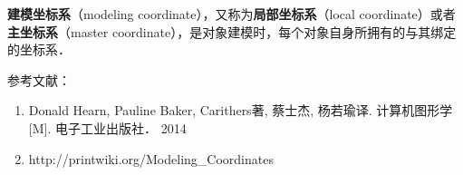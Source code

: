 
\textbf{建模坐标系}（modeling coordinate），又称为\textbf{局部坐标系}（local coordinate）或者\textbf{主坐标系}（master coordinate），是对象建模时，每个对象自身所拥有的与其绑定的坐标系．





参考文献：
\begin{enumerate}
\item Donald Hearn, Pauline Baker, Carithers著, 蔡士杰, 杨若瑜译. 计算机图形学[M]. 电子工业出版社． 2014
\item http://printwiki.org/Modeling_Coordinates
\end{enumerate}